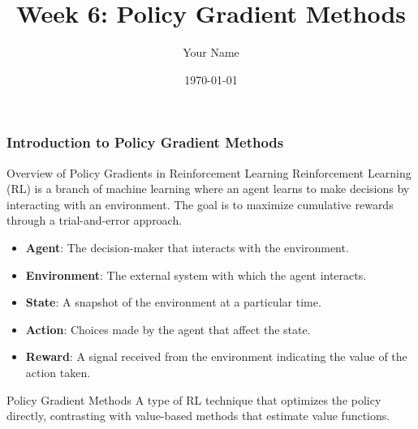 \documentclass{beamer}
\title{Week 6: Policy Gradient Methods}
\author{Your Name}
\institute{Your Institution}
\date{\today}
\begin{document}
\frame{\titlepage}

\begin{frame}[fragile]
    \frametitle{Introduction to Policy Gradient Methods}
    
    \begin{block}{Overview of Policy Gradients in Reinforcement Learning}
        Reinforcement Learning (RL) is a branch of machine learning where an agent learns to make decisions by interacting with an environment. The goal is to maximize cumulative rewards through a trial-and-error approach.
    \end{block}
    
    \begin{itemize}
        \item \textbf{Agent}: The decision-maker that interacts with the environment.
        \item \textbf{Environment}: The external system with which the agent interacts.
        \item \textbf{State}: A snapshot of the environment at a particular time.
        \item \textbf{Action}: Choices made by the agent that affect the state.
        \item \textbf{Reward}: A signal received from the environment indicating the value of the action taken.
    \end{itemize}
    
    \begin{block}{Policy Gradient Methods}
        A type of RL technique that optimizes the policy directly, contrasting with value-based methods that estimate value functions.
    \end{block}
\end{frame}
\end{document}
